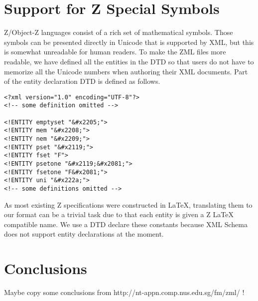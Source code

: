 \section{Support for Z Special Symbols}

Z/Object-Z languages consist of a rich set of mathematical symbols. Those
symbols can be presented directly in Unicode that is supported by XML,
but this is somewhat unreadable for human readers.  To make the ZML
files more readable, we have defined all the entities in the DTD so that
users do not have to memorize all the Unicode numbers when authoring their
XML documents. Part of the entity declaration DTD is defined as follows. 

\begin{verbatim} 
<?xml version="1.0" encoding="UTF-8"?>
<!-- some definition omitted -->

<!ENTITY emptyset "&#x2205;">
<!ENTITY mem "&#x2208;">
<!ENTITY nem "&#x2209;">
<!ENTITY pset "&#x2119;">
<!ENTITY fset "F">
<!ENTITY psetone "&#x2119;&#x2081;">
<!ENTITY fsetone "F&#x2081;">
<!ENTITY uni "&#x222a;">
<!-- some definitions omitted -->
\end{verbatim}

As most existing Z specifications were constructed in LaTeX, translating
them to our format can be a trivial task due to that each entity is given a
Z LaTeX compatible name.  We use a DTD declare these constants 
because XML Schema does not support entity declarations at the moment.

 
\section{Conclusions}


  Maybe copy some conclusions from http://nt-appn.comp.nus.edu.sg/fm/zml/ !

